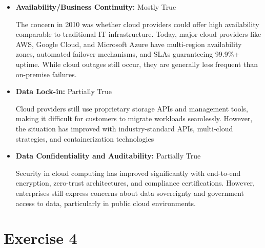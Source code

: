 \documentclass{article}
\newcommand{\exercise}[1]{
    \section*{Exercise #1}
    \markboth{Exercise #1}{}
}
\begin{document}
\begin{itemize}
  \item \textbf{Availability/Business Continuity:}\newline
  Mostly True\newline

  The concern in 2010 was whether cloud providers could offer
  high availability comparable to traditional IT infrastructure.
  Today, major cloud providers like AWS, Google Cloud,
  and Microsoft Azure have multi-region availability zones,
  automated failover mechanisms, and SLAs guaranteeing 99.9\%+ 
  uptime. While cloud outages still occur, they are generally
  less frequent than on-premise failures.

  \item \textbf{Data Lock-in:}
  Partially True\newline

  Cloud providers still use proprietary storage APIs and
  management tools, making it difficult for customers
  to migrate workloads seamlessly. However, the situation
  has improved with industry-standard APIs, multi-cloud
  strategies, and containerization technologies
  
  \item \textbf{Data Confidentiality and Auditability:}
  Partially True\newline

  Security in cloud computing has improved significantly
  with end-to-end encryption, zero-trust architectures,
  and compliance certifications. However, enterprises
  still express concerns about data sovereignty and
  government access to data, particularly in public cloud
  environments.
\end{itemize}




\newpage

\exercise{4}
\end{document}
